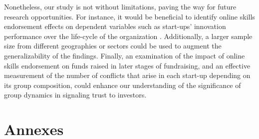 \documentclass[12pt]{article}
\begin{document}
Nonetheless, our study is not without limitations, paving the way for future research opportunities. For instance, it would be beneficial to identify online skills endorsement effects on dependent variables such as start-ups' innovation performance over the life-cycle of the organization \citep{knight2020start}. Additionally, a larger sample size from different geographies or sectors could be used to augment the generalizability of the findings. Finally, an examination of the impact of online skills endorsement on funds raised in later stages of fundraising, and an effective measurement of the number of conflicts that arise in each start-up depending on its group composition, could enhance our understanding of the significance of group dynamics in signaling trust to investors.

\clearpage



\clearpage
\section{Annexes}
\end{document}
